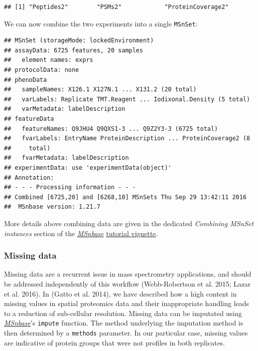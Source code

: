\begin{verbatim}
## [1] "Peptides2"        "PSMs2"            "ProteinCoverage2"
\end{verbatim}

We can now combine the two experiments into a single \texttt{MSnSet}:

\begin{Shaded}
\begin{Highlighting}[]
\StringTok{ }
\end{Highlighting}
\end{Shaded}

\begin{verbatim}
## MSnSet (storageMode: lockedEnvironment)
## assayData: 6725 features, 20 samples 
##   element names: exprs 
## protocolData: none
## phenoData
##   sampleNames: X126.1 X127N.1 ... X131.2 (20 total)
##   varLabels: Replicate TMT.Reagent ... Iodixonal.Density (5 total)
##   varMetadata: labelDescription
## featureData
##   featureNames: Q9JHU4 Q9QXS1-3 ... Q9Z2Y3-3 (6725 total)
##   fvarLabels: EntryName ProteinDescription ... ProteinCoverage2 (8
##     total)
##   fvarMetadata: labelDescription
## experimentData: use 'experimentData(object)'
## Annotation:  
## - - - Processing information - - -
## Combined [6725,20] and [6268,10] MSnSets Thu Sep 29 13:42:11 2016 
##  MSnbase version: 1.21.7
\end{verbatim}

More details above combining data are given in the dedicated
\emph{Combining MSnSet instances} section of the
\emph{\href{http://bioconductor.org/packages/MSnbase}{MSnbase}}
\href{http://bioconductor.org/packages/release/bioc/vignettes/MSnbase/inst/doc/MSnbase-demo.pdf}{tutorial
vignette}.

\subsubsection{Missing data}\label{missing-data}

Missing data are a recurrent issue in mass spectrometry applications,
and should be addressed independently of this workflow (Webb-Robertson
et al. 2015; Lazar et al. 2016). In (Gatto et al. 2014), we have
described how a high content in missing values in spatial proteomics
data and their inappropriate handling leads to a reduction of
sub-cellular resolution. Missing data can be imputated using
\emph{\href{http://bioconductor.org/packages/MSnbase}{MSnbase}}'s
\texttt{impute} function. The method underlying the imputation method is
then determined by a \texttt{methods} parameter. In our particular case,
missing values are indicative of protein groups that were not profiles
in both replicates.

